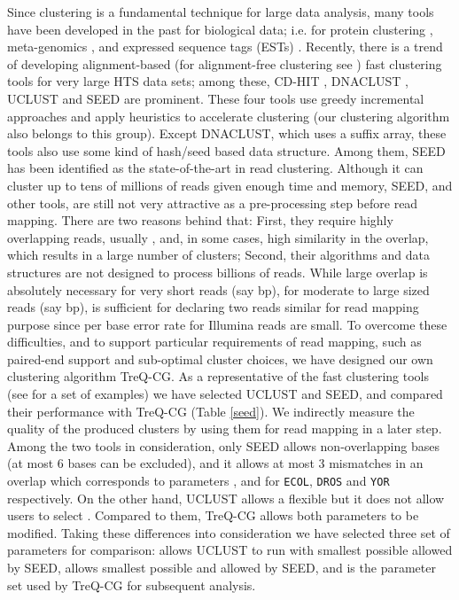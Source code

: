 \documentclass[a4paper]{article}
\begin{document}
Since clustering is a fundamental technique for large data analysis,
many tools have been developed in the past for biological data; i.e.
for protein clustering \cite{Pipenbacher01102002,Loewenstein01072008,Li01072006},
meta-genomics \cite{20388221,10.1371/journal.pone.0003042,10.1371/journal.pbio.0050016,10.1371/journal.pone.0003375},
and expressed sequence tags
(ESTs) \cite{Pertea22032003,Burke01111999,16026600,Hazelhurst15122011}.
Recently, there is a trend of developing alignment-based (for alignment-free clustering see \cite{24011402})
fast clustering tools for very large HTS data sets;
among these, CD-HIT \cite{Fu01122012}, DNACLUST \cite{21718538}, UCLUST \cite{Edgar01102010}
and SEED \cite{Bao:2011ia} are prominent. These four tools
use greedy incremental approaches and apply heuristics to accelerate
clustering (our clustering algorithm also belongs to this group).
Except DNACLUST, which uses a suffix array, these tools also use
some kind of hash/seed based data structure.
Among them, SEED \cite{Bao:2011ia} has been identified as the
state-of-the-art in read clustering. Although it can cluster
up to tens of millions of reads given enough time and memory,
SEED, and other tools, are still not very attractive as a pre-processing
step before read mapping.
There are two reasons behind that: First, they require highly
overlapping reads, usually , and, in some cases, high
similarity in the overlap, which results in a large number of clusters;
Second, their
algorithms and data structures are not designed to process billions of
reads.
While large overlap is absolutely necessary for very short reads
(say bp), for moderate to large sized reads (say bp),
 is
sufficient for declaring two reads similar for read mapping purpose
since per base error rate for Illumina reads are small.
To overcome these difficulties, and to support particular
requirements of read mapping, such as paired-end support and sub-optimal
cluster choices, we have designed our own clustering algorithm TreQ-CG.
As a representative of the fast clustering tools (see \cite{Li:2012cq}
for a set of examples) we have selected UCLUST
and SEED, and compared their performance with
TreQ-CG (Table \ref{seed}). We indirectly
measure the quality of the produced
clusters by using them for read mapping in a later step.
Among the two tools in consideration, only SEED allows non-overlapping
bases (at most 6 bases can be excluded), and it allows at
most 3 mismatches in an overlap which corresponds to
parameters
,
 and
 for {\tt ECOL}, {\tt DROS} and
{\tt YOR} respectively.
On the other hand, UCLUST allows a flexible  but it does not
allow users to select . Compared to them, TreQ-CG allows both
parameters to be modified. Taking these differences into consideration
we have selected three set of parameters for comparison:
 allows UCLUST to run with smallest possible  allowed by SEED,
 allows smallest possible  and  allowed by SEED, and
 is the parameter set used by TreQ-CG for subsequent analysis.
\end{document}
